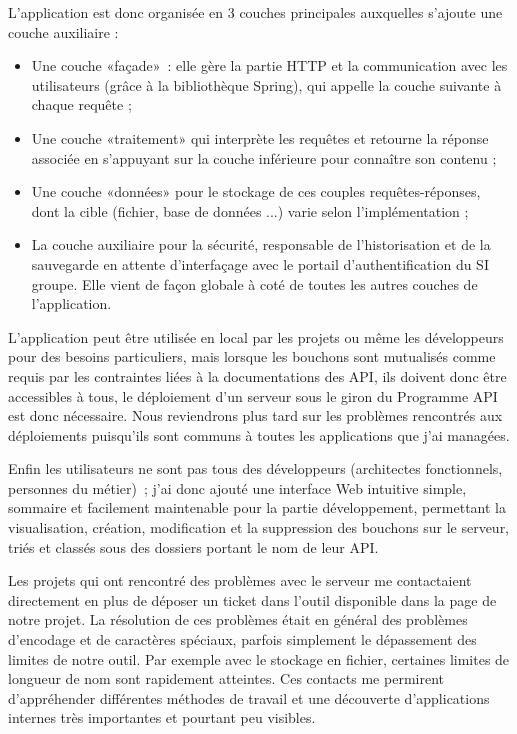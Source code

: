         L'application est donc organisée en 3 couches principales auxquelles s’ajoute une couche auxiliaire :
        \begin{itemize}
            \item Une couche «façade» : elle gère la partie HTTP et la communication avec les utilisateurs (grâce à la bibliothèque Spring), qui appelle la couche suivante à chaque requête ;
            \item Une couche «traitement» qui interprète les requêtes et retourne la réponse associée en s’appuyant sur la couche inférieure pour connaître son contenu ;
            \item Une couche «données» pour le stockage de ces couples requêtes-réponses, dont la cible (fichier, base de données ...) varie selon l’implémentation ;
            \item La couche auxiliaire pour la sécurité, responsable de l’historisation et de la sauvegarde en attente d’interfaçage avec le portail d’authentification du SI groupe. Elle vient de façon globale à coté de toutes les autres couches de l’application.
        \end{itemize}
        \vspace{\parskip} %

        L’application peut être utilisée en local par les projets ou même les développeurs pour des besoins particuliers, mais lorsque les bouchons sont mutualisés comme requis par les contraintes liées à la documentations des API, ils doivent donc être accessibles à tous, le déploiement d’un serveur sous le giron du Programme API est donc nécessaire.
        Nous reviendrons plus tard sur les problèmes rencontrés aux déploiements puisqu’ils sont communs à toutes les applications que j'ai managées.

        Enfin les utilisateurs ne sont pas tous des développeurs (architectes fonctionnels, personnes du métier) ; j’ai donc ajouté une interface Web intuitive simple, sommaire et facilement maintenable pour la partie développement, permettant la visualisation, création, modification et la suppression des bouchons sur le serveur, triés et classés sous des dossiers portant le nom de leur API.

        Les projets qui ont rencontré des problèmes avec le serveur me contactaient directement en plus de déposer un ticket dans l’outil disponible dans la page de notre projet.
        La résolution de ces problèmes était en général des problèmes d’encodage et de caractères spéciaux, parfois simplement le dépassement des limites de notre outil.
        Par exemple avec le stockage en fichier, certaines limites de longueur de nom sont rapidement atteintes.
        Ces contacts me permirent d’appréhender différentes méthodes de travail et une découverte d’applications internes très importantes et pourtant peu visibles.


